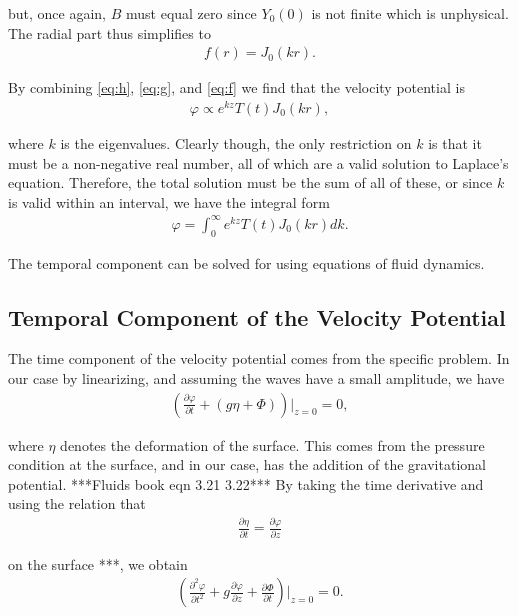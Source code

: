 \documentclass[12pt]{article}
\begin{document}
but, once again, $B$ must equal zero since $Y_0(0)$ is not finite which is unphysical. The radial part thus simplifies to
\begin{align}
\label{eq:f}
f(r) = J_0(kr).
\end{align}

By combining \eqref{eq:h}, \eqref{eq:g}, and \eqref{eq:f} we find that the velocity potential is 
\begin{align*}
\varphi \propto e^{kz}T(t)J_0(kr),
\end{align*}

where $k$ is the eigenvalues. Clearly though, the only restriction on $k$ is that it must be a non-negative real number, all of which are a valid solution to Laplace's equation. Therefore, the total solution must be the sum of all of these, or since $k$ is valid within an interval, we have the integral form 
\begin{align}
\label{eq:phieigen}
\varphi = \int_0^\infty e^{kz}T(t)J_0(kr)dk.
\end{align}

The temporal component can be solved for using equations of fluid dynamics.

\subsection{Temporal Component of the Velocity Potential}

The time component of the velocity potential comes from the specific problem. In our case by linearizing, and assuming the waves have a small amplitude, we have
\begin{align*}
\left( \frac{\partial \varphi}{\partial t} + (g \eta + \Phi) \right) \bigg|_{z=0} = 0,
\end{align*}

where $\eta$ denotes the deformation of the surface. This comes from the pressure condition at the surface, and in our case, has the addition of the gravitational potential. ***Fluids book eqn 3.21 3.22*** By taking the time derivative and using the relation that
\begin{align}
\label{eq:smallamp}
\frac{\partial \eta}{\partial t} = \frac{\partial \varphi}{\partial z}
\end{align}

on the surface ***, we obtain
\begin{align}
\label{eq:presscond}
\left( \frac{\partial^2 \varphi}{\partial t^2} + g \frac{\partial \varphi}{\partial z} + \frac{\partial \Phi}{\partial t} \right) \bigg|_{z=0} = 0.
\end{align}
\end{document}
